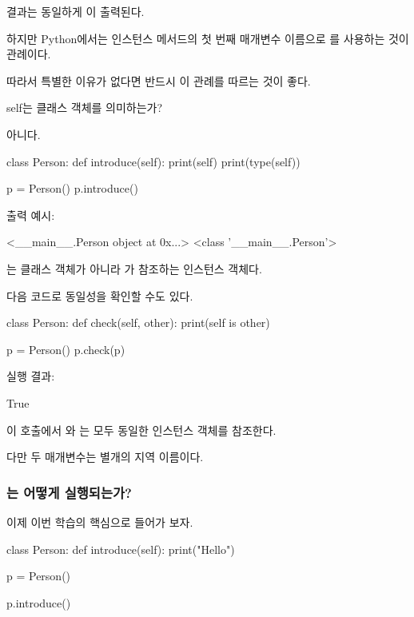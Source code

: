 결과는 동일하게 이 출력된다.

하지만 Python에서는 인스턴스 메서드의 첫 번째 매개변수 이름으로 를 사용하는 것이 관례이다.

따라서 특별한 이유가 없다면 반드시 이 관례를 따르는 것이 좋다.

\begin{dhknote}
\begin{dhksmry}[centered]
self는 클래스 객체를 의미하는가?
\end{dhksmry}
\end{dhknote}

아니다.

\begin{dhkcode}
class Person:
    def introduce(self):
        print(self)
        print(type(self))

p = Person()
p.introduce()
\end{dhkcode}

출력 예시:

\begin{dhkzsh}
<__main__.Person object at 0x...>
<class '__main__.Person'>
\end{dhkzsh}

는  클래스 객체가 아니라 가 참조하는 인스턴스 객체다.

다음 코드로 동일성을 확인할 수도 있다.

\begin{dhkcode}
class Person:
    def check(self, other):
        print(self is other)


p = Person()
p.check(p)
\end{dhkcode}

실행 결과:

\begin{dhkzsh}
True
\end{dhkzsh}

이 호출에서 와 는 모두 동일한 인스턴스 객체를 참조한다.

다만 두 매개변수는 별개의 지역 이름이다.

\subsubsection{는 어떻게 실행되는가?}

이제 이번 학습의 핵심으로 들어가 보자.

\begin{dhkcode}
class Person:
    def introduce(self):
        print("Hello")

p = Person()

p.introduce()
\end{dhkcode}

